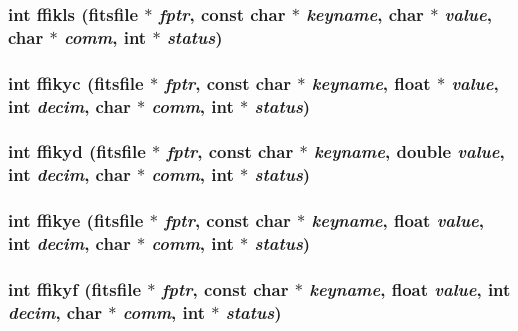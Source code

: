 \subsubsection{\setlength{\rightskip}{0pt plus 5cm}int ffikls (\bf{fitsfile} $\ast$ {\em fptr}, const char $\ast$ {\em keyname}, char $\ast$ {\em value}, char $\ast$ {\em comm}, int $\ast$ {\em status})}\label{fitsio__64_8h_b9a20f40733eee26b83630247c6c7d6c}


\subsubsection{\setlength{\rightskip}{0pt plus 5cm}int ffikyc (\bf{fitsfile} $\ast$ {\em fptr}, const char $\ast$ {\em keyname}, float $\ast$ {\em value}, int {\em decim}, char $\ast$ {\em comm}, int $\ast$ {\em status})}\label{fitsio__64_8h_bf26af1c6bb6452cc6d4b4e9b794175c}


\subsubsection{\setlength{\rightskip}{0pt plus 5cm}int ffikyd (\bf{fitsfile} $\ast$ {\em fptr}, const char $\ast$ {\em keyname}, double {\em value}, int {\em decim}, char $\ast$ {\em comm}, int $\ast$ {\em status})}\label{fitsio__64_8h_80b6addc96fa00ec452a71201de4c474}


\subsubsection{\setlength{\rightskip}{0pt plus 5cm}int ffikye (\bf{fitsfile} $\ast$ {\em fptr}, const char $\ast$ {\em keyname}, float {\em value}, int {\em decim}, char $\ast$ {\em comm}, int $\ast$ {\em status})}\label{fitsio__64_8h_5be69827a5b1a21b310dc0e73e59c450}


\subsubsection{\setlength{\rightskip}{0pt plus 5cm}int ffikyf (\bf{fitsfile} $\ast$ {\em fptr}, const char $\ast$ {\em keyname}, float {\em value}, int {\em decim}, char $\ast$ {\em comm}, int $\ast$ {\em status})}\label{fitsio__64_8h_ad8778b73662002f227e92cca425ce1a}


